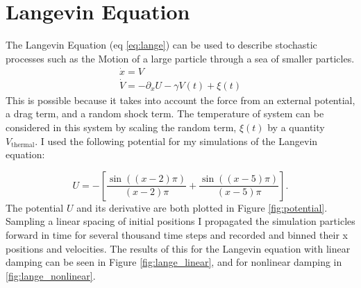 \documentclass[]{article}
\begin{document}
\section{Langevin Equation}
The Langevin Equation (eq \ref{eq:lange}) can be used to describe stochastic processes such as the Motion of a large particle through a sea of smaller particles. 
\begin{align}
\dot{x} = V \nonumber\\
\dot{V} = -\partial_x U -\gamma V(t) + \xi(t)
\label{eq:lange}
\end{align}
This is possible because it takes into account the force from an external potential, a drag term, and a random shock term. The temperature of system can be considered in this system by scaling the random term, $\xi(t)$ by a quantity $V_{\text{thermal}}$. I used the following potential for my simulations of the Langevin equation:

\begin{equation}
	U = -\left[\frac{\sin ((x-2)\pi)}{(x-2)\pi}+\frac{\sin ((x-5)\pi)}{(x-5)\pi}\right].
	\label{eq:potential}
\end{equation}
The potential $U$ and its derivative are both plotted in Figure \ref{fig:potential}. Sampling a linear spacing of initial positions I propagated the simulation particles forward in time for several thousand time steps and recorded and binned their x positions and velocities. The results of this for the Langevin equation with linear damping can be seen in Figure \ref{fig:lange_linear}, and for nonlinear damping in \ref{fig:lange_nonlinear}.
\end{document}
